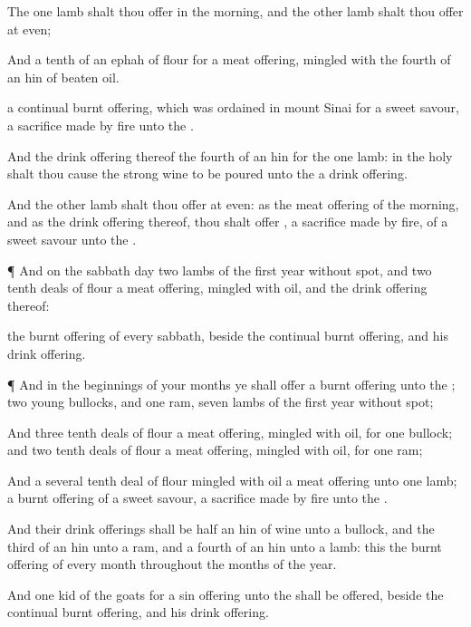 {The
one
lamb shalt thou
offer in the
morning, and the
other
lamb shalt thou
offer at
even;

And a
tenth
{} of an
ephah of
flour for a meat
offering,
mingled with the
fourth
{} of an
hin of
beaten
oil.

 a
continual burnt
offering, which was
ordained in
mount
Sinai for a
sweet
savour, a sacrifice made by
fire unto the
{}.

And the drink
offering thereof
{} the
fourth
{} of an
hin for the
one
lamb: in the
holy
{} shalt thou cause the strong
wine to be
poured unto the
{}
{} a drink
offering.

And the
other
lamb shalt thou
offer at
even: as the meat
offering of the
morning, and as the drink
offering thereof, thou shalt
offer
{}, a sacrifice made by
fire, of a
sweet
savour unto the
{}.


\par }{\PP {}¶ And on the
sabbath
day
two
lambs of the
first
year without
spot, and
two
tenth deals of
flour
{} a meat
offering,
mingled with
oil, and the drink
offering thereof:

 the burnt
offering of every
sabbath, beside the
continual burnt
offering, and his drink
offering.


\par }{\PP {}¶ And in the
beginnings of your
months ye shall
offer a burnt
offering unto the
{};
two
young
bullocks, and
one
ram,
seven
lambs of the
first
year without
spot;

And
three tenth
deals of
flour
{} a meat
offering,
mingled with
oil, for
one
bullock; and
two
tenth deals of
flour
{} a meat
offering,
mingled with
oil, for
one
ram;

And a several tenth
deal of
flour
mingled with
oil
{} a meat
offering unto
one
lamb;
{} a burnt
offering of a
sweet
savour, a sacrifice made by
fire unto the
{}.

And their drink
offerings shall be
half an
hin of
wine unto a
bullock, and the
third
{} of an
hin unto a
ram, and a
fourth
{} of an
hin unto a
lamb: this
{} the burnt
offering of every
month throughout the
months of the
year.

And
one
kid of the
goats for a sin
offering unto the
{} shall be
offered, beside the
continual burnt
offering, and his drink
offering.


}
